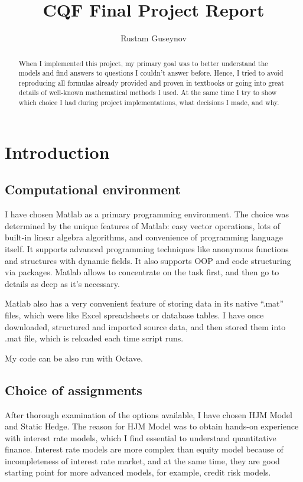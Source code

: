 \documentclass[11pt]{article} %
\title{CQF Final Project Report}
\author{Rustam Guseynov}
\begin{document}
\maketitle
\begin{abstract}
When I implemented this project, my primary goal was to better understand the models and find answers to questions I couldn't answer before. Hence, I tried to avoid reproducing all formulas already provided and proven in textbooks or going into great details of well-known mathematical methods I used. At the same time I try to show which choice I had during project implementations, what decisions I made, and why.
\end{abstract}

\section{Introduction}
\subsection{Computational environment}
I have chosen Matlab as a primary programming environment. The choice was determined by the unique features of Matlab: easy vector operations, lots of built-in linear algebra algorithms, and convenience of programming language itself. It supports advanced programming techniques like anonymous functions and structures with dynamic fields. It also supports OOP and code structuring via packages. Matlab allows to concentrate on the task first, and then go to details as deep as it's necessary.

Matlab also has a very convenient feature of storing data in its native ``.mat'' files, which were like Excel spreadsheets or database tables. I have once downloaded, structured and imported source data, and then stored them into .mat file, which is reloaded each time script runs.

My code can be also run with Octave. %

\subsection{Choice of assignments}
After thorough examination of the options available, I have chosen HJM Model and Static Hedge. The reason for HJM Model was to obtain hands-on experience with interest rate models, which I find essential to understand quantitative finance. Interest rate models are more complex than equity model because of incompleteness of interest rate market, and at the same time, they are good starting point for more advanced models, for example, credit risk models.
\end{document}
